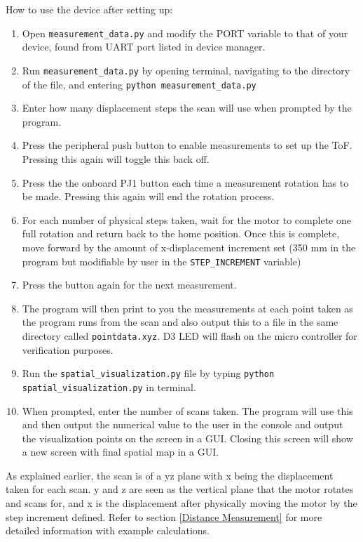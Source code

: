 \documentclass[12pt, letterpaper]{article}
\begin{document}
How to use the device after setting up: 
\begin{enumerate}
    \item Open \verb|measurement_data.py| and modify the PORT variable to that of your device, found from UART port listed in device manager. 
    \item Run \verb|measurement_data.py| by opening terminal, navigating to the directory of the file, and entering \verb|python measurement_data.py|
    \item Enter how many displacement steps the scan will use when prompted by the program. 
    \item Press the peripheral push button to enable measurements to set up the ToF. Pressing this again will toggle this back off.
    \item Press the the onboard PJ1 button each time a measurement rotation has to be made. Pressing this again will end the rotation process.
    \item For each number of physical steps taken, wait for the motor to complete one full rotation and return back to the home position. Once this is complete, move forward by the amount of x-displacement increment set (350 mm in the program but modifiable by user in the \verb|STEP_INCREMENT| variable) 
    \item Press the button again for the next measurement.
    \item The program will then print to you the measurements at each point taken as the program runs from the scan and also output this to a file in the same directory called \verb|pointdata.xyz|. D3 LED will flash on the micro controller for verification purposes. 
    \item Run the \verb|spatial_visualization.py| file by typing \verb|python spatial_visualization.py| in terminal.
    \item When prompted, enter the number of scans taken. The program will use this and then output the numerical value to the user in the console and output the visualization points on the screen in a GUI. Closing this screen will show a new screen with final spatial map in a GUI. 
\end{enumerate}
As explained earlier, the scan is of a yz plane with x being the displacement taken for each scan. y and z are seen as the vertical plane that the motor rotates and scans for, and x is the displacement after physically moving the motor by the step increment defined. Refer to section \ref{Distance Measurement} for more detailed information with example calculations.
\end{document}
